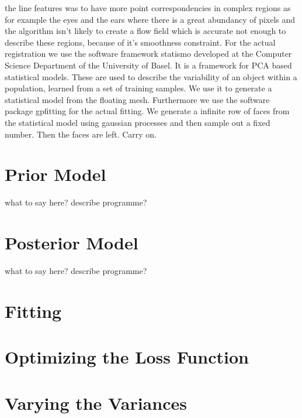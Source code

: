 the line features was to have more point correspondencies in complex regions as for example the eyes and the ears where there is a great abundancy of pixels and the algorithm isn’t likely to create a flow field which is accurate not enough to describe these regions, because of it’s smoothness constraint.
For the actual registration we use the software framework statismo developed at the Computer Science Department of the University of Basel. It is a framework for PCA based statistical models. These are used to describe the variability of an object within a population, learned from a set of training samples. We use it to generate a statistical model from the floating mesh. Furthermore we use the software package gpfitting for the actual fitting. We generate a infinite row of
faces from the statistical model using gaussian processes and then sample out a fixed number. Then the faces are left. Carry on.

\section{Prior Model}
what to say here? describe programme?
\section{Posterior Model}
what to say here? describe programme?

\section{Fitting}

\section{Optimizing the Loss Function}

\section{Varying the Variances}
